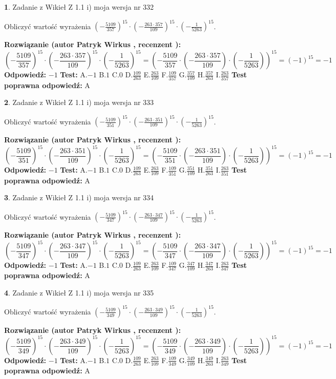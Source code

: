 \documentclass[12pt, a4paper]{article}
\theoremstyle{definition} %
\newtheorem{zad}{}
\newcommand{\zadStart}[1]{\begin{zad}#1\newline}
\newcommand{\zadStop}{\end{zad}}
\newcommand{\rozwStart}[2]{\noindent \textbf{Rozwiązanie (autor #1 , recenzent #2): }\newline}
\newcommand{\rozwStop}{\newline}
\newcommand{\odpStart}{\noindent \textbf{Odpowiedź:}\newline}
\newcommand{\odpStop}{\newline}
\newcommand{\testStart}{\noindent \textbf{Test:}\newline}
\newcommand{\testStop}{\newline}
\newcommand{\kluczStart}{\noindent \textbf{Test poprawna odpowiedź:}\newline}
\newcommand{\kluczStop}{\newline}
\begin{document}
\zadStart{Zadanie z Wikieł Z 1.1 i) moja wersja nr 332}

Obliczyć wartość wyrażenia $(-\frac{5109}{357})^{15} \cdot (-\frac{263 \cdot 357}{109})^{15} \cdot (-\frac{1}{5263})^{15}$.
\zadStop
\rozwStart{Patryk Wirkus}{}
$$(-\frac{5109}{357})^{15} \cdot (-\frac{263 \cdot 357}{109})^{15} \cdot (-\frac{1}{5263})^{15} = (-\frac{5109}{357} \cdot (-\frac{263 \cdot 357}{109}) \cdot (-\frac{1}{5263}))^{15} = (-1)^{15} = -1$$
\rozwStop
\odpStart
$-1$
\odpStop
\testStart
A.$-1$ B.$1$ C.$0$ D.$\frac{109}{263}$ E.$\frac{263}{109}$
F.$\frac{109}{357}$ G.$\frac{357}{109}$
H.$\frac{357}{263}$
I.$\frac{263}{357}$
\testStop
\kluczStart
A
\kluczStop



\zadStart{Zadanie z Wikieł Z 1.1 i) moja wersja nr 333}

Obliczyć wartość wyrażenia $(-\frac{5109}{351})^{15} \cdot (-\frac{263 \cdot 351}{109})^{15} \cdot (-\frac{1}{5263})^{15}$.
\zadStop
\rozwStart{Patryk Wirkus}{}
$$(-\frac{5109}{351})^{15} \cdot (-\frac{263 \cdot 351}{109})^{15} \cdot (-\frac{1}{5263})^{15} = (-\frac{5109}{351} \cdot (-\frac{263 \cdot 351}{109}) \cdot (-\frac{1}{5263}))^{15} = (-1)^{15} = -1$$
\rozwStop
\odpStart
$-1$
\odpStop
\testStart
A.$-1$ B.$1$ C.$0$ D.$\frac{109}{263}$ E.$\frac{263}{109}$
F.$\frac{109}{351}$ G.$\frac{351}{109}$
H.$\frac{351}{263}$
I.$\frac{263}{351}$
\testStop
\kluczStart
A
\kluczStop



\zadStart{Zadanie z Wikieł Z 1.1 i) moja wersja nr 334}

Obliczyć wartość wyrażenia $(-\frac{5109}{347})^{15} \cdot (-\frac{263 \cdot 347}{109})^{15} \cdot (-\frac{1}{5263})^{15}$.
\zadStop
\rozwStart{Patryk Wirkus}{}
$$(-\frac{5109}{347})^{15} \cdot (-\frac{263 \cdot 347}{109})^{15} \cdot (-\frac{1}{5263})^{15} = (-\frac{5109}{347} \cdot (-\frac{263 \cdot 347}{109}) \cdot (-\frac{1}{5263}))^{15} = (-1)^{15} = -1$$
\rozwStop
\odpStart
$-1$
\odpStop
\testStart
A.$-1$ B.$1$ C.$0$ D.$\frac{109}{263}$ E.$\frac{263}{109}$
F.$\frac{109}{347}$ G.$\frac{347}{109}$
H.$\frac{347}{263}$
I.$\frac{263}{347}$
\testStop
\kluczStart
A
\kluczStop



\zadStart{Zadanie z Wikieł Z 1.1 i) moja wersja nr 335}

Obliczyć wartość wyrażenia $(-\frac{5109}{349})^{15} \cdot (-\frac{263 \cdot 349}{109})^{15} \cdot (-\frac{1}{5263})^{15}$.
\zadStop
\rozwStart{Patryk Wirkus}{}
$$(-\frac{5109}{349})^{15} \cdot (-\frac{263 \cdot 349}{109})^{15} \cdot (-\frac{1}{5263})^{15} = (-\frac{5109}{349} \cdot (-\frac{263 \cdot 349}{109}) \cdot (-\frac{1}{5263}))^{15} = (-1)^{15} = -1$$
\rozwStop
\odpStart
$-1$
\odpStop
\testStart
A.$-1$ B.$1$ C.$0$ D.$\frac{109}{263}$ E.$\frac{263}{109}$
F.$\frac{109}{349}$ G.$\frac{349}{109}$
H.$\frac{349}{263}$
I.$\frac{263}{349}$
\testStop
\kluczStart
A
\kluczStop
\end{document}
